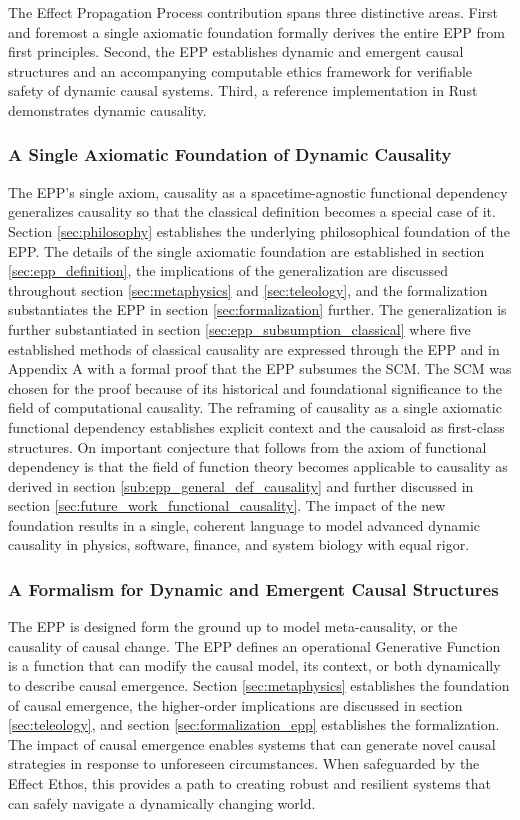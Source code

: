 The Effect Propagation Process contribution spans three distinctive areas. First and foremost a single axiomatic foundation  formally derives the entire EPP from first principles. Second, the EPP establishes dynamic and emergent causal structures and an accompanying computable ethics framework for verifiable safety of dynamic causal systems. Third, a reference implementation in Rust demonstrates dynamic causality.   


\subsubsection{A Single Axiomatic Foundation of Dynamic Causality}

The EPP's single axiom, causality as a spacetime-agnostic functional dependency generalizes causality so that the classical definition becomes a special case of it. Section \ref{sec:philosophy} establishes the underlying philosophical foundation of the EPP. The details of the single axiomatic foundation are established in section \ref{sec:epp_definition}, the implications of the generalization are discussed throughout section \ref{sec:metaphysics} and \ref{sec:teleology}, and the formalization substantiates the EPP in section \ref{sec:formalization} further. The generalization is further substantiated in section \ref{sec:epp_subsumption_classical} where five established methods of classical causality are expressed through the EPP  and in Appendix A with a formal proof that the EPP subsumes the SCM. The SCM was chosen for the proof because of its historical and foundational significance to the field of computational causality. The reframing of causality as a single axiomatic functional dependency establishes explicit context and the causaloid as first-class structures. On important conjecture that follows from the axiom of functional dependency is that the field of function theory becomes applicable to causality as derived in section \ref{sub:epp_general_def_causality} and further discussed in section \ref{sec:future_work_functional_causality}. The impact of the new foundation results in a single, coherent language to model advanced dynamic causality in physics, software, finance, and system biology with equal rigor.

\subsubsection{A Formalism for Dynamic and Emergent Causal Structures}


The EPP is designed form the ground up to model meta-causality, or the causality of causal change. The EPP defines an operational Generative Function is a function that can modify the causal model, its context, or both dynamically to describe causal emergence. Section \ref{sec:metaphysics} establishes the foundation of causal emergence, the higher-order implications are discussed in section \ref{sec:teleology}, and section \ref{sec:formalization_epp} establishes the formalization. The impact of causal emergence enables systems that can generate novel causal strategies in response to unforeseen circumstances. When safeguarded by the Effect Ethos, this provides a path to creating robust and resilient systems that can safely navigate a dynamically changing world.

